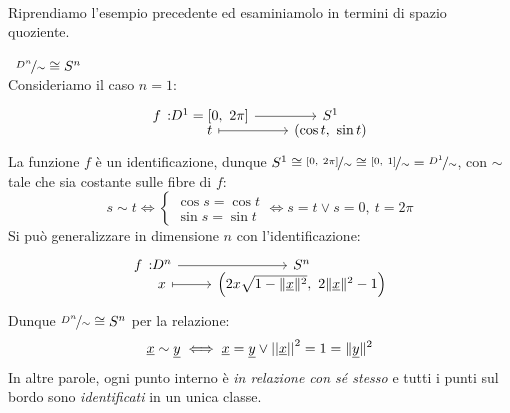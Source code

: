 	\begin{minipage}[t]{0.16\textwidth}\vspace{1mm}
	\end{minipage}\vspace{3mm}\\
Riprendiamo l'esempio precedente ed esaminiamolo in termini di spazio quoziente.
\begin{example}~{$\nicefrac{D^n}{\sim}\cong S^n$}\\
	Consideriamo il caso $n=1$:
	\begin{equation*}
		\funztot f {D^1=[0, \ 2\pi]} {S^1} t {(\cos t, \ \sin t)}
	\end{equation*}
	La funzione $f$ è un identificazione, dunque $S^1\cong \nicefrac{[0, \ 2\pi]}{\sim}\cong \nicefrac{[0, \ 1]}{\sim}=\nicefrac{D^1}{\sim}$, con $\sim$ tale che sia costante sulle fibre di $f$:
	\begin{equation*}
		 s\sim t \iff \begin{cases}
			\cos s=\cos t \\
			\sin s =\sin t
		\end{cases} \iff s=t  \vee s=0,\ t=2\pi
	\end{equation*} \newline
	Si può generalizzare in dimensione $n$ con l'identificazione:
	\begin{equation*}
		\funztot f {D^n} {S^n} x {\left( 2x\sqrt{1- \| \underline{x} \|^2}, \ 2\| \underline{x}\|^2 -1 \right)}
	\end{equation*}
	Dunque $\nicefrac{D^n}{\sim}\cong S^n$ per la relazione:
\begin{equation*}
	\underline{x}\sim \underline{y} \iff \underline{x}=\underline{y} \vee \left|\left| \underline{x} \right|\right| ^2 = 1 = \| \underline{y} \| ^2
\end{equation*}
	In altre parole, ogni punto interno è \textit{in relazione con sé stesso} e tutti i punti sul bordo sono \textit{identificati} in un unica classe.
\end{example}
	
